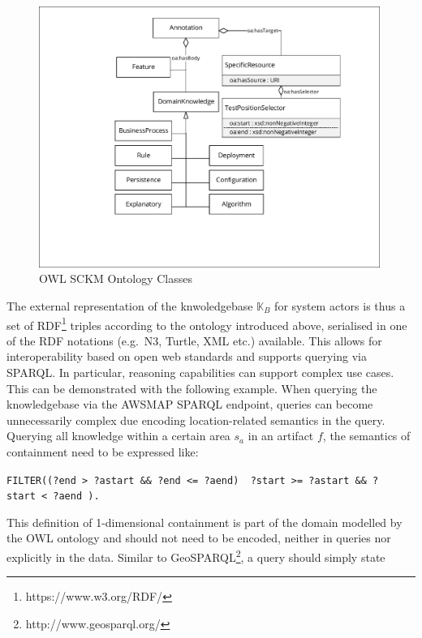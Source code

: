 \begin{figure}
\hypertarget{fig:ontology}{%
\centering
\includegraphics[width=0.99\textwidth]{../figures/awsm-re-ontology.pdf}
\caption{OWL SCKM Ontology Classes}\label{fig:ontology}
}
\end{figure}

The external representation of the knwoledgebase \(\mathbb{K}_{B}\) for system actors is thus a set of RDF\footnote{https://www.w3.org/RDF/} triples according to the ontology introduced above, serialised in one of the RDF notations (e.g.~N3, Turtle, XML etc.) available.
This allows for interoperability based on open web standards and supports querying via SPARQL.
In particular, reasoning capabilities can support complex use cases.
This can be demonstrated with the following example.
When querying the knowledgebase via the AWSMAP SPARQL endpoint, queries can become unnecessarily complex due encoding location-related semantics in the query.
Querying all knowledge within a certain area \(s_a\) in an artifact \(f\), the semantics of containment need to be expressed like:

\texttt{FILTER((?end\ \textgreater{}\ ?astart\ \&\&\ ?end\ \textless{}=\ ?aend)\ \textbar{}\textbar{}\ ?start\ \textgreater{}=\ ?astart\ \&\&\ ?start\ \textless{}\ ?aend\ ).}

This definition of 1-dimensional containment is part of the domain modelled by the OWL ontology and should not need to be encoded, neither in queries nor explicitly in the data.
Similar to GeoSPARQL\footnote{http://www.geosparql.org/}, a query should simply state

